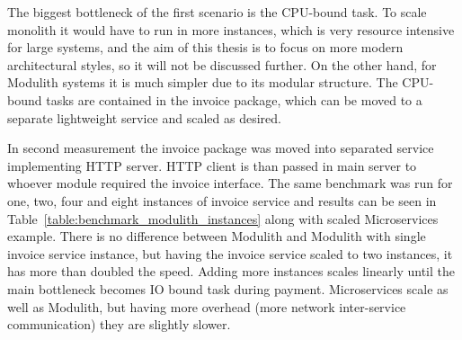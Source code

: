The biggest bottleneck of the first scenario is the CPU-bound task. To scale monolith it would have to run in more instances, which is very resource intensive for large systems, and the aim of this thesis is to focus on more modern architectural styles, so it will not be discussed further. On the other hand, for Modulith systems it is much simpler due to its modular structure. The CPU-bound tasks are contained in the invoice package, which can be moved to a separate lightweight service and scaled as desired.

In second measurement the invoice package was moved into separated service implementing HTTP server. HTTP client is than passed in main server to whoever module required the invoice interface. The same benchmark was run for one, two, four and eight instances of invoice service and results can be seen in Table~\ref{table:benchmark_modulith_instances} along with scaled Microservices example. There is no difference between Modulith and Modulith with single invoice service instance, but having the invoice service scaled to two instances, it has more than doubled the speed. Adding more instances scales linearly until the main bottleneck becomes IO bound task during payment. Microservices scale as well as Modulith, but having more overhead (more network inter-service communication) they are slightly slower.

